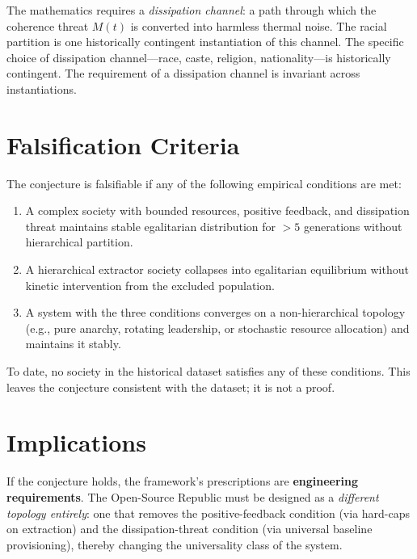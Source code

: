 The mathematics requires a \textit{dissipation channel}: a path through which the coherence threat $M(t)$ is converted into harmless thermal noise. The racial partition is one historically contingent instantiation of this channel. The specific choice of dissipation channel---race, caste, religion, nationality---is historically contingent. The requirement of a dissipation channel is invariant across instantiations.

\section{Falsification Criteria}

The conjecture is falsifiable if any of the following empirical conditions are met:
\begin{enumerate}
    \item A complex society with bounded resources, positive feedback, and dissipation threat maintains stable egalitarian distribution for $>5$ generations without hierarchical partition.
    \item A hierarchical extractor society collapses into egalitarian equilibrium without kinetic intervention from the excluded population.
    \item A system with the three conditions converges on a non-hierarchical topology (e.g., pure anarchy, rotating leadership, or stochastic resource allocation) and maintains it stably.
\end{enumerate}

To date, no society in the historical dataset satisfies any of these conditions. This leaves the conjecture consistent with the dataset; it is not a proof.

\section{Implications}

If the conjecture holds, the framework's prescriptions are \textbf{engineering requirements}. The Open-Source Republic must be designed as a \textit{different topology entirely}: one that removes the positive-feedback condition (via hard-caps on extraction) and the dissipation-threat condition (via universal baseline provisioning), thereby changing the universality class of the system.

\backmatter

\printbibliography



